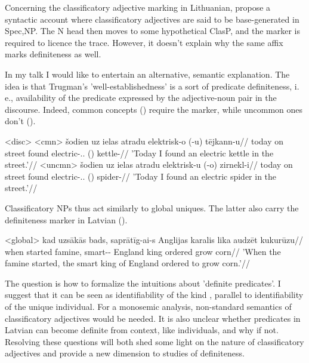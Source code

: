 \documentclass[a4paper, 12pt]{article}
\begin{document}
\begin{sloppypar}
Concerning the classificatory adjective marking in Lithuanian, \citep{rutpro2006} propose a syntactic account where classificatory adjectives are said to be base-generated in Spec,NP. The N head then moves to some hypothetical ClasP, and the marker is required to licence the trace. However, it doesn't explain why the same affix marks definiteness as well.

In my talk I would like to entertain an alternative, semantic explanation. The idea is that Trugman's 'well-establishedness' is a sort of predicate definiteness, i. e., availability of the predicate expressed by the adjective-noun pair in the discourse. Indeed, common concepts () require the marker, while uncommon ones don't ().

\pex<disc>
    \a<cmn> \begingl
        \gla šodien uz ielas atradu elektrisk-o (\judge{*}-u) tējkann-u//
        \glb today on street found electric-\M.\Def.\Acc{} (\Indef) kettle-\Acc{}//
        \glft 'Today I found an electric kettle in the street.'//
    \endgl
    \a<uncmn> \begingl
    \gla šodien uz ielas atradu elektrisk-u (\judge{*}-o) zirnekl-i//
    \glb today on street found electric-\M.\Indef.\Acc{} (\Def) spider-\Acc{}//
    \glft 'Today I found an electric spider in the street.'//
\endgl
\xe

Classificatory NPs thus act similarly to global uniques. The latter also carry the definiteness marker in Latvian (\nextx).

\ex<global>
    \begingl
        \gla kad uzsākās bads, saprātīg-ai-s Anglijas karalis lika audzēt kukurūzu//
        \glb when started famine, smart-\Def-\Nom{} England king ordered grow corn//
        \glft 'When the famine started, the smart king of England ordered to grow corn.'//
    \endgl
\xe



The question is how to formalize the intuitions about 'definite predicates'. I suggest that it can be seen as identifiability of the kind \citep{chierchia1998}, parallel to identifiability of the unique individual. For a monosemic analysis, non-standard semantics of classificatory adjectives would be needed. It is also unclear whether predicates in Latvian can become definite from context, like individuals, and why if not. Resolving these questions will both shed some light on the nature of classificatory adjectives and provide a new dimension to studies of definiteness.



\end{sloppypar}
\end{document}
